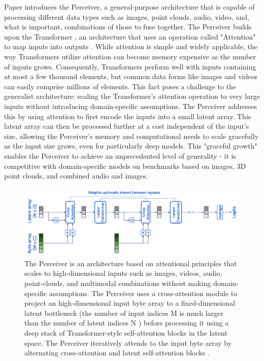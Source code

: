 Paper \cite{jaeglePerceiverGeneralPerception2021} introduces the Perceiver, a general-purpose architecture that is capable of processing different data types such as images, point clouds, audio, video, and, what is important, combinations of those to fuse together. The Perceiver builds upon the Transformer \cite{}, an architecture that uses an operation called "Attention" to map inputs into outputs \cite{}. While attention is simple and widely applicable, the way Transformers utilize attention can become memory expensive as the number of inputs grows. Consequently, Transformers perform well with inputs containing at most a few thousand elements, but common data forms like images and videos can easily comprise millions of elements. This fact poses a challenge to the generalist architecture: scaling the Transformer's attention operation to very large inputs without introducing domain-specific assumptions. The Perceiver addresses this by using attention to first encode the inputs into a small latent array. This latent array can then be processed further at a cost independent of the input's size, allowing the Perceiver's memory and computational needs to scale gracefully as the input size grows, even for particularly deep models. This "graceful growth" enables the Perceiver to achieve an unprecedented level of generality - it is competitive with domain-specific models on benchmarks based on images, 3D point clouds, and combined audio and images.

\begin{figure}
    \centering
    \includegraphics[width=\textwidth]{figures/figure_background_perceiver_architecture.png}
    \caption{The Perceiver is an architecture based on attentional principles that scales to high-dimensional inputs such as images, videos, audio, point-clouds, and multimodal combinations without making domain-specific assumptions. The Perceiver uses a cross-attention module to project an high-dimensional input byte array to a fixed-dimensional latent bottleneck (the number of input indices M is much larger than the number of latent indices N ) before processing it using a deep stack of Transformer-style self-attention blocks in the latent space. The Perceiver iteratively attends to the input byte array by alternating cross-attention and latent self-attention blocks \cite{jaeglePerceiverGeneralPerception2021}.}
    \label{fig:figure_background_perceiver_architecture}
\end{figure}

